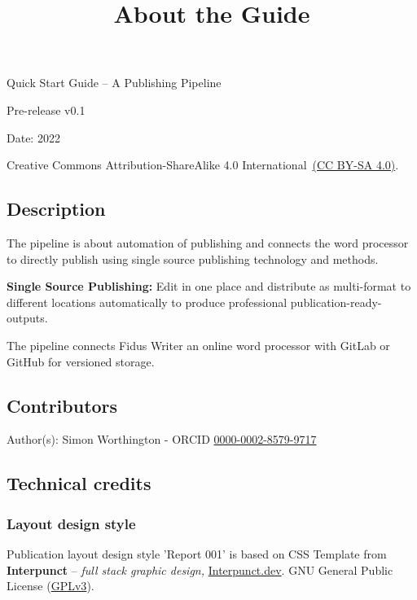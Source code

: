 \documentclass{article}
\begin{document}
\title{About the Guide}

\maketitle


Quick Start Guide – A Publishing Pipeline


Pre-release v0.1


Date: 2022


Creative Commons Attribution-ShareAlike 4.0 International \href{https://creativecommons.org/licenses/by-sa/4.0/}{(CC BY-SA 4.0)}.


\subsection{Description}\label{H8229716}



The pipeline is about automation of publishing and connects the word processor to directly publish using single source publishing technology and methods.


\textbf{Single Source Publishing:} Edit in one place and distribute as multi-format to different locations automatically to produce professional publication-ready-outputs.


The pipeline connects Fidus Writer an online word processor with GitLab or GitHub for versioned storage.


\subsection{Contributors}\label{H5465299}



Author(s): Simon Worthington - ORCID \href{https://orcid.org/0000-0002-8579-9717}{0000-0002-8579-9717}


\subsection{Technical credits}\label{H2281570}



\subsubsection{Layout design style}\label{H2431584}



Publication layout design style 'Report 001' is based on CSS Template from \textbf{Interpunct} – \emph{full stack graphic design,} \href{https://interpunct.dev/}{Interpunct.dev}. GNU General Public License (\href{https://www.gnu.org/licenses/gpl-3.0.html}{GPLv3}).
\end{document}
